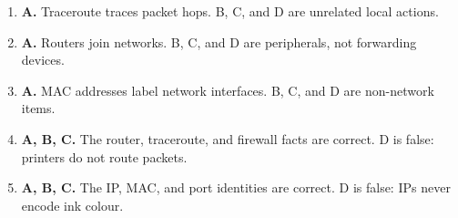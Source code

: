 \documentclass[11pt]{article}
\begin{document}
\begin{enumerate}[label=\textbf{Q\arabic*.}, leftmargin=*]
\item \textbf{A.} Traceroute traces packet hops. B, C, and D are unrelated local actions.
\item \textbf{A.} Routers join networks. B, C, and D are peripherals, not forwarding devices.
\item \textbf{A.} MAC addresses label network interfaces. B, C, and D are non-network items.
\item \textbf{A, B, C.} The router, traceroute, and firewall facts are correct. D is false: printers do not route packets.
\item \textbf{A, B, C.} The IP, MAC, and port identities are correct. D is false: IPs never encode ink colour.
\end{enumerate}
\def\JKSSBLessonID{66}\def\JKSSBAnswers{1}
\end{document}
